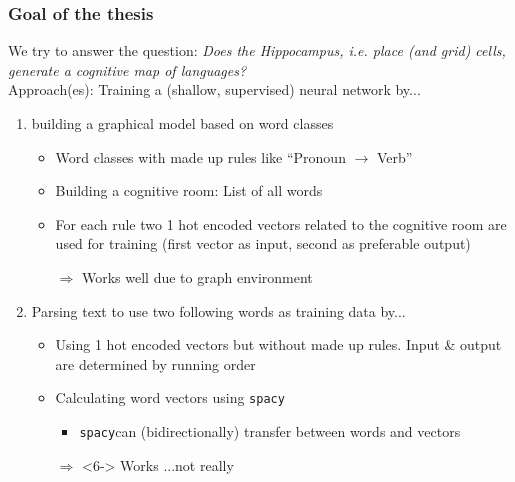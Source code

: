 \documentclass[t]{beamer}
\newcommand{\Emph}[1]{\textbf{#1}}
\newcommand{\spacy}{\texttt{spacy}}
\newcommand{\os}[1]{\onslide<+->{#1}}
\begin{document}
\begin{frame}
	\frametitle{Goal of the thesis}
	We try to answer the question: \emph{Does the Hippocampus, i.e. place (and grid) cells, generate a cognitive map of languages?} \\
	\bigskip
	Approach(es): Training a (shallow, supervised) neural network by...
	\smallskip
	\begin{enumerate}
		\item building a graphical model based on word classes
			\begin{itemize}
				\item Word classes with made up rules like ``Pronoun $ \to $ Verb''
				\item Building a cognitive room: List of all words
				\item For each rule two 1 hot encoded vectors related to the cognitive room are used for training (first vector as input, second as preferable output)
				\item[$ \Rightarrow $] Works well due to graph environment 
			\end{itemize}
		\item<2-> Parsing text to use two following words as training data by...
			\begin{itemize}
				\item<3-> Using 1 hot encoded vectors but without made up rules. Input \& output are determined by running order
				\item<4-> Calculating word vectors using \spacy %
				\begin{itemize}
					\item<5-> \spacy \space can (bidirectionally) transfer between words and vectors
				\end{itemize}
				\item[$ \Rightarrow $]<6-> Works ...not really
			\end{itemize}
	\end{enumerate}
\os{
}
\end{frame}
\end{document}
